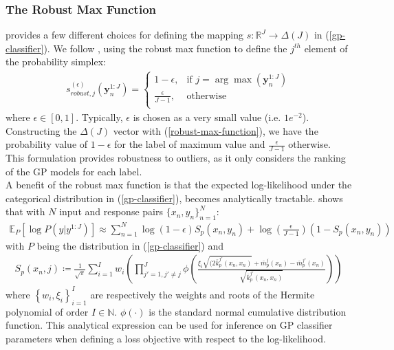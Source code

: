 \documentclass{article}
\numberwithin{equation}{section}
\begin{document}
\subsubsection{The Robust Max Function}
\cite{matthews2017scalable} provides a few different choices for defining the mapping $s: \mathbb{R}^J \rightarrow \Delta(J)$ in (\ref{gp-classifier}). We follow \cite{wild2022generalized}, using the robust max function to define the $j^{th}$ element of the probability simplex:
\begin{align}
s_{robust, j}^{(\epsilon)}\left(\mathbf{y}_n^{1:J}\right) = \begin{cases}
      1-\epsilon, &  \text{if } j = \arg \max\left(\mathbf{y}_n^{1:J}\right) \\
      \frac{\epsilon}{J-1}, & \text{otherwise} \\
   \end{cases}
   \label{robust-max-function}
\end{align}
where $\epsilon \in [0, 1]$. Typically, $\epsilon$ is chosen as a very small value (i.e. $1e^{-2}$). Constructing the $\Delta(J)$ vector with (\ref{robust-max-function}), we have the probability value of $1-\epsilon$ for the label of maximum value and $\frac{\epsilon}{J-1}$ otherwise. This formulation provides robustness to outliers, as it only considers the ranking of the GP models for each label.
\\A benefit of the robust max function is that the expected log-likelihood under the categorical distribution in (\ref{gp-classifier}), becomes analytically tractable. \cite{wild2022generalized} shows that with $N$ input and response pairs $\{x_n, y_n\}_{n=1}^N$:
\begin{align}
    \mathbb{E}_{P} \left[\log P\left(y \vert y^{1:J}\right)\right] \approx \sum_{n=1}^N \log(1-\epsilon) S_p(x_n, y_n) + \log\left(\frac{\epsilon}{J-1}\right) \left(1-S_p(x_n, y_n)\right)
    \label{robust-max-function-expected-log-likelihood}
\end{align}
with $P$ being the distribution in (\ref{gp-classifier}) and 
\begin{align}
    S_p(x_n, j) \coloneqq \frac{1}{\sqrt{\pi}}\sum_{i=1}^{I} w_i \left(\prod_{j'=1, j'\neq j}^J \phi\left(\frac{\xi_i\sqrt{(2 \bar{k}^{j'}_p(x_n, x_n)}+\bar{m}^{j}_p(x_n) - \bar{m}^{j'}_p(x_n)}{\sqrt{\bar{k}^{j'}_p(x_n, x_n)}}\right)\right)
\end{align}
where $\left\{w_i, \xi_i\right\}_{i=1}^I$ are respectively the weights and roots of the Hermite polynomial of order $I \in \mathbb{N}$. $\phi(\cdot)$ is the standard normal cumulative distribution function. This analytical expression can be used for inference on GP classifier parameters when defining a loss objective with respect to the log-likelihood.
\end{document}
